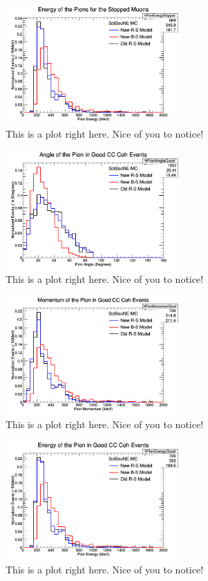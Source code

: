 \documentclass[11pt]{article}
\begin{document}
\begin{figure}[H]
\centering
\includegraphics[width=0.6\textwidth]{NMPionPlottingImages/6-NMPionPlotting.png}
\caption{This is a plot right here. Nice of you to notice!}
\end{figure}

\begin{figure}[H]
\centering
\includegraphics[width=0.6\textwidth]{NMPionPlottingImages/7-NMPionPlotting.png}
\caption{This is a plot right here. Nice of you to notice!}
\end{figure}

\begin{figure}[H]
\centering
\includegraphics[width=0.6\textwidth]{NMPionPlottingImages/8-NMPionPlotting.png}
\caption{This is a plot right here. Nice of you to notice!}
\end{figure}

\begin{figure}[H]
\centering
\includegraphics[width=0.6\textwidth]{NMPionPlottingImages/9-NMPionPlotting.png}
\caption{This is a plot right here. Nice of you to notice!}
\end{figure}
\end{document}
